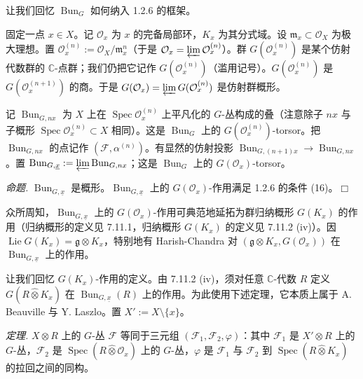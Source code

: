 
让我们回忆 $\operatorname{Bun}_G$ 如何纳入 1.2.6 的框架。


 固定一点 $x\in X$。记 $\mathcal{O}_x$ 为 $x$ 的完备局部环，$K_x$ 为其分式域。设 $\mathfrak{m}_x\subset\mathcal{O}_X$ 为极大理想。置 $\mathcal{O}_x^{(n)}:=\mathcal{O}_X/\mathfrak{m}_x^{n}$（于是 $\mathcal{O}_x=\varprojlim\mathcal{O}_x^{(n)}$）。群 $G(\mathcal{O}_x^{(n)})$ 是某个仿射代数群的 $\mathbb{C}$-点群；我们仍把它记作 $G(\mathcal{O}_x^{(n)})$（滥用记号）。$G(\mathcal{O}_x^{(n)})$ 是 $G(\mathcal{O}_x^{(n+1)})$ 的商。于是 $G(\mathcal{O}_x)=\varprojlim G(\mathcal{O}_x^{(n)})$ 是仿射群概形。

记 $\operatorname{Bun}_{G,nx}$ 为 $X$ 上在 $\operatorname{Spec}\mathcal{O}_x^{(n)}$ 上平凡化的 $G$-丛构成的叠（注意除子 $nx$ 与子概形 $\operatorname{Spec}\mathcal{O}_x^{(n)}\subset X$ 相同）。这是 $\operatorname{Bun}_G$ 上的 $G(\mathcal{O}_x^{(n)})$-torsor。把 $\operatorname{Bun}_{G,nx}$ 的点记作 $(\mathcal{F},\alpha^{(n)})$。有显然的仿射投影 $\operatorname{Bun}_{G,(n+1)x}\to\operatorname{Bun}_{G,nx}$。置 $\operatorname{Bun}_{G,\underline{x}}:=\varprojlim\operatorname{Bun}_{G,nx}$；这是 $\operatorname{Bun}_G$ 上的 $G(\mathcal{O}_x)$-torsor。

 \emph{命题.} $\operatorname{Bun}_{G,\underline{x}}$ 是概形。$\operatorname{Bun}_{G,\underline{x}}$ 上的 $G(\mathcal{O}_x)$-作用满足 1.2.6 的条件 (16)。\hfill$\Box$

 众所周知，$\operatorname{Bun}_{G,\underline{x}}$ 上的 $G(\mathcal{O}_x)$-作用可典范地延拓为群归纳概形 $G(K_x)$ 的作用（归纳概形的定义见 7.11.1，归纳概形 $G(K_x)$ 的定义见 7.11.2 (iv)）。因 $\operatorname{Lie}G(K_x)=\mathfrak{g}\otimes K_x$，特别地有 Harish-Chandra 对 $(\mathfrak{g}\otimes K_x,G(\mathcal{O}_x))$ 在 $\operatorname{Bun}_{G,\underline{x}}$ 上的作用。

让我们回忆 $G(K_x)$-作用的定义。由 7.11.2 (iv)，须对任意 $\mathbb{C}$-代数 $R$ 定义 $G(R\widehat{\otimes}K_x)$ 在 $\operatorname{Bun}_{G,\underline{x}}(R)$ 上的作用。为此使用下述定理，它本质上属于 A. Beauville 与 Y. Laszlo。置 $X':=X\setminus\{x\}$。

 \emph{定理.} $X\otimes R$ 上的 $G$-丛 $\mathcal{F}$ 等同于三元组 $(\mathcal{F}_1,\mathcal{F}_2,\varphi)$：其中 $\mathcal{F}_1$ 是 $X'\otimes R$ 上的 $G$-丛，$\mathcal{F}_2$ 是 $\operatorname{Spec}(R\widehat{\otimes}\mathcal{O}_x)$ 上的 $G$-丛，$\varphi$ 是 $\mathcal{F}_1$ 与 $\mathcal{F}_2$ 到 $\operatorname{Spec}(R\widehat{\otimes}K_x)$ 的拉回之间的同构。

